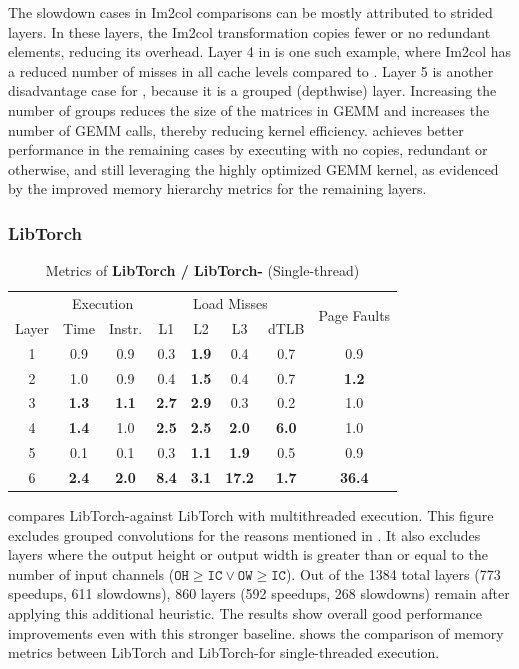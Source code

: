 The slowdown cases in Im2col comparisons can be mostly attributed to strided layers.
In these layers, the Im2col transformation copies fewer or no redundant elements, reducing its overhead.
Layer 4 in  is one such example, where Im2col has a reduced number of misses in all cache levels compared to \algname.
Layer 5 is another disadvantage case for \algname, because it is a grouped (depthwise) layer.
Increasing the number of groups reduces the size of the matrices in GEMM and increases the number of GEMM calls, thereby reducing kernel efficiency.
\algname achieves better performance in the remaining cases by executing with no copies, redundant or otherwise, and still leveraging the highly optimized GEMM kernel, as evidenced by the improved memory hierarchy metrics for the remaining layers.

\subsubsection{LibTorch}
\label{sec:libtorch}

\begin{table}[t]
    \caption{Metrics of \textbf{LibTorch / LibTorch-\algname} (Single-thread)}
    \label{tab:libtorch-perf}
    \small
    \setlength{\tabcolsep}{3pt} %
    \centering
    \begin{tabular}{c|cc|cccc|c}
        & \multicolumn{2}{c|}{Execution} & \multicolumn{4}{c|}{Load Misses} & \multirow{2}{*}{Page Faults} \\
        Layer & Time & Instr. & L1 & L2 & L3 & dTLB & \\ \hline
        1 & 0.9 & 0.9 & 0.3 & \textbf{1.9} & 0.4 & 0.7 & 0.9 \\
        2 & 1.0 & 0.9 & 0.4 & \textbf{1.5} & 0.4 & 0.7 & \textbf{1.2} \\
        3 & \textbf{1.3} & \textbf{1.1} & \textbf{2.7} & \textbf{2.9} & 0.3 & 0.2 & 1.0 \\
        4 & \textbf{1.4} & 1.0 & \textbf{2.5} & \textbf{2.5} & \textbf{2.0} & \textbf{6.0} & 1.0 \\
        5 & 0.1 & 0.1 & 0.3 & \textbf{1.1} & \textbf{1.9} & 0.5 & 0.9 \\
        6 & \textbf{2.4} & \textbf{2.0} & \textbf{8.4} & \textbf{3.1} & \textbf{17.2} & \textbf{1.7} & \textbf{36.4} \\
    \end{tabular}
\end{table}


 compares LibTorch-\algname against LibTorch with multithreaded execution.
This figure excludes grouped convolutions for the reasons mentioned in .
It also excludes layers where the output height or output width is greater than or equal to the number of input channels ($\texttt{OH} \geq \texttt{IC} \lor \texttt{OW} \geq \texttt{IC}$).
Out of the 1384 total layers (773 speedups, 611 slowdowns), 860 layers (592 speedups, 268 slowdowns) remain after applying this additional heuristic.
The results show overall good performance improvements even with this stronger baseline.
 shows the comparison of memory metrics between LibTorch and LibTorch-\algname for single-threaded execution.

